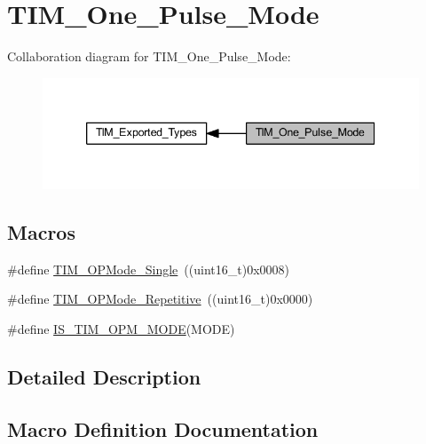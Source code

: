 \hypertarget{group___t_i_m___one___pulse___mode}{}\section{T\+I\+M\+\_\+\+One\+\_\+\+Pulse\+\_\+\+Mode}
\label{group___t_i_m___one___pulse___mode}
Collaboration diagram for T\+I\+M\+\_\+\+One\+\_\+\+Pulse\+\_\+\+Mode\+:
\nopagebreak
\begin{figure}[H]
\begin{center}
\leavevmode
\includegraphics[width=339pt]{group___t_i_m___one___pulse___mode}
\end{center}
\end{figure}
\subsection*{Macros}
\begin{DoxyCompactItemize}
\item 
\#define \hyperlink{group___t_i_m___one___pulse___mode_ga99d934fdbc54ea4ee2cf5c86860f9227}{T\+I\+M\+\_\+\+O\+P\+Mode\+\_\+\+Single}~((uint16\+\_\+t)0x0008)
\item 
\#define \hyperlink{group___t_i_m___one___pulse___mode_gad921d739c86bf48dca12442a81ad68ad}{T\+I\+M\+\_\+\+O\+P\+Mode\+\_\+\+Repetitive}~((uint16\+\_\+t)0x0000)
\item 
\#define \hyperlink{group___t_i_m___one___pulse___mode_ga3f4a4305b4feacb4322eb4a358e54637}{I\+S\+\_\+\+T\+I\+M\+\_\+\+O\+P\+M\+\_\+\+M\+O\+DE}(M\+O\+DE)
\end{DoxyCompactItemize}


\subsection{Detailed Description}


\subsection{Macro Definition Documentation}
\mbox{\label{group___t_i_m___one___pulse___mode_ga3f4a4305b4feacb4322eb4a358e54637}} 
